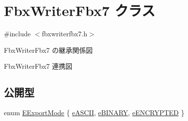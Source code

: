 \hypertarget{class_fbx_writer_fbx7}{}\section{Fbx\+Writer\+Fbx7 クラス}
\label{class_fbx_writer_fbx7}


{\ttfamily \#include $<$fbxwriterfbx7.\+h$>$}



Fbx\+Writer\+Fbx7 の継承関係図


Fbx\+Writer\+Fbx7 連携図
\subsection*{公開型}
\begin{DoxyCompactItemize}
\item 
enum \hyperlink{class_fbx_writer_fbx7_a07b7bcbb11c9befcbd0eacd265458005}{E\+Export\+Mode} \{ \hyperlink{class_fbx_writer_fbx7_a07b7bcbb11c9befcbd0eacd265458005a9c649ae90e48a57517f8f0f58fa5e4d0}{e\+A\+S\+C\+II}, 
\hyperlink{class_fbx_writer_fbx7_a07b7bcbb11c9befcbd0eacd265458005ae35342b371e32d2059779877d6a48233}{e\+B\+I\+N\+A\+RY}, 
\hyperlink{class_fbx_writer_fbx7_a07b7bcbb11c9befcbd0eacd265458005acf6f86dc6ac9f629d312d997e35b5b14}{e\+E\+N\+C\+R\+Y\+P\+T\+ED}
 \}
\end{DoxyCompactItemize}
